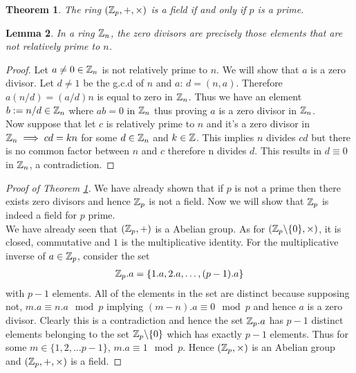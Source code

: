 \documentclass[12pt]{article}
\newtheorem{thm}{Theorem}
\newtheorem{lem}[thm]{Lemma}
\theoremstyle{definition}
\begin{document}
\begin{thm}
\label{Zp:Prime Field}
The ring $(\mathbb{Z}_p,+,\times)$ is a field if and only if $p$ is a prime.
\end{thm}

\begin{lem}
In a ring $\mathbb{Z}_n$, the zero divisors are precisely those elements that are not relatively prime to $n$.
\end{lem}
\begin{proof} Let $a\neq 0\in\mathbb{Z}_{n}$ is not relatively prime to $n$. We will show that $a$ is a zero divisor. Let $d\neq 1$ be the g.c.d of $n$ and $a$: $d=(n,a)$. Therefore $a(n/d)=(a/d)n$ is equal to zero in $\mathbb{Z}_n$. Thus we have an element $b:=n/d \in \mathbb{Z}_n$ where $ab=0$ in $\mathbb{Z}_{n}$ thus proving $a$ is a zero divisor in $\mathbb{Z}_n$.  \\

Now suppose that let $c$ is relatively prime to $n$ and it's a zero divisor in $\mathbb{Z}_n\implies cd=kn$ for some $d\in\mathbb{Z}_n$ and $k\in\mathbb{Z}$. This implies $n$ divides $cd$ but there is no common factor between $n$ and $c$ therefore n divides $d$. This results in $d\equiv 0$ in $\mathbb{Z}_n$, a contradiction. 
\end{proof}
\begin{proof}[Proof of Theorem \ref{Zp:Prime Field}]
We have already shown that if $p$ is not a prime then there exists zero divisors and hence $\mathbb{Z}_p$ is not a field. Now we will show that $\mathbb{Z}_{p}$ is indeed a field for $p$ prime.\\

We have already seen that $(\mathbb{Z}_p,+)$ is a Abelian group. As for $(\mathbb{Z}_p\backslash \{0\},\times)$, it is closed, commutative and $1$ is the multiplicative identity. For the multiplicative inverse of $a\in\mathbb{Z}_p$, consider the set 
\begin{align*}
\mathbb{Z}_p.a=\{1.a,2.a,\ldots,(p-1).a\}
\end{align*}
with $p-1$ elements. All of the elements in the set are distinct because supposing not, $m.a\equiv n.a \mod p$ implying $(m-n).a\equiv 0 \mod p$ and hence $a$ is a zero divisor. Clearly this is a contradiction and hence the set $\mathbb{Z}_p.a$ has $p-1$ distinct elements belonging to the set $\mathbb{Z}_p\backslash \{0\}$ which has exactly $p-1$ elements. Thus for some $m\in\{1,2,\ldots p-1\}$, $m.a\equiv 1 \mod p$. Hence $(\mathbb{Z}_p,\times)$ is an Abelian group and $(\mathbb{Z}_p,+,\times)$ is a field.
\end{proof}
\end{document}
